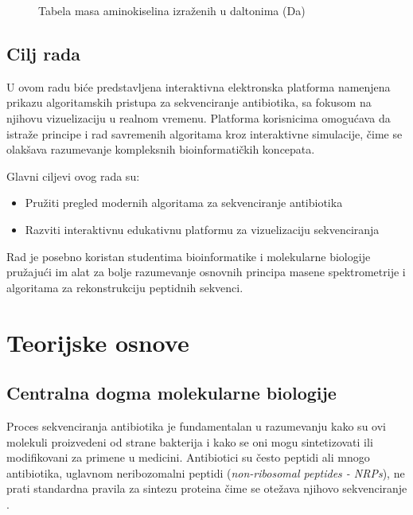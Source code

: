 \documentclass[12pt,oneside]{memoir}
\begin{document}
\begin{figure}[h]
  \centering
  
  \caption{Tabela masa aminokiselina izraženih u daltonima (Da)}
  \label{fig:aminokiseline}
\end{figure}

\section{Cilj rada}
U ovom radu biće predstavljena interaktivna elektronska platforma namenjena prikazu algoritamskih pristupa za sekvenciranje antibiotika, sa fokusom na njihovu vizuelizaciju u realnom vremenu. Platforma korisnicima omogućava da istraže principe i rad savremenih algoritama kroz interaktivne simulacije, čime se olakšava razumevanje kompleksnih bioinformatičkih koncepata.

Glavni ciljevi ovog rada su:
\begin{itemize}
    \item Pružiti pregled modernih algoritama za sekvenciranje antibiotika
    \item Razviti interaktivnu edukativnu platformu za vizuelizaciju sekvenciranja
\end{itemize}

Rad je posebno koristan studentima bioinformatike i molekularne biologije pružajući im alat za bolje razumevanje osnovnih principa masene spektrometrije i algoritama za rekonstrukciju peptidnih sekvenci.

\chapter{Teorijske osnove}

\section{Centralna dogma molekularne biologije}
Proces sekvenciranja antibiotika je fundamentalan u razumevanju kako su ovi molekuli proizvedeni od strane bakterija i kako se oni mogu sintetizovati ili modifikovani za primene u medicini. Antibiotici su često peptidi ali mnogo antibiotika, uglavnom neribozomalni peptidi (\emph{non-ribosomal peptides - NRPs}), ne prati standardna pravila za sintezu proteina čime se otežava njihovo sekvenciranje \cite{online_lecture, online_book}.
\end{document}
